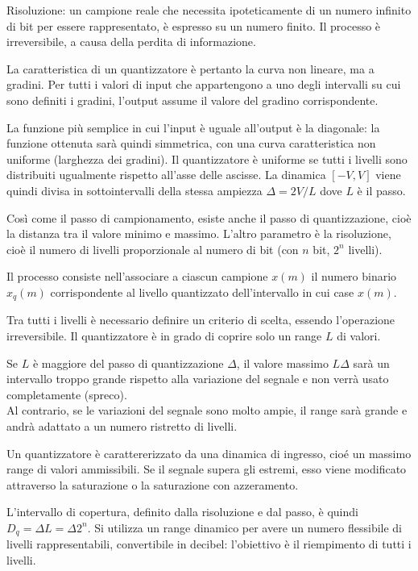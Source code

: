 Risoluzione: un campione reale che necessita ipoteticamente di un numero infinito di bit per essere rappresentato, è espresso su un numero finito. Il processo è irreversibile, a causa della perdita di informazione.

La caratteristica di un quantizzatore è pertanto la curva non lineare, ma a gradini. Per tutti i valori di input che appartengono a uno degli intervalli su cui sono definiti i gradini, l'output assume il valore del gradino corrispondente.

La funzione più semplice in cui l'input è uguale all'output è la diagonale: la funzione ottenuta sarà quindi simmetrica, con una curva caratteristica non uniforme (larghezza dei gradini). Il quantizzatore è uniforme se tutti i livelli sono distribuiti ugualmente rispetto all'asse delle ascisse. La dinamica $[-V, V]$ viene quindi divisa in sottointervalli della stessa ampiezza $\Delta = 2V / L$ dove $L$ è il passo. 

Così come il passo di campionamento, esiste anche il passo di quantizzazione, cioè la distanza tra il valore minimo e massimo. L'altro parametro è la risoluzione, cioè il numero di livelli proporzionale al numero di bit (con $n$ bit, $2^n$ livelli). 

Il processo consiste nell'associare a ciascun campione $x(m)$ il numero binario $x_q(m)$ corrispondente al livello quantizzato dell'intervallo in cui case $x(m)$.

Tra tutti i livelli è necessario definire un criterio di scelta, essendo l'operazione irreversibile. Il quantizzatore è in grado di coprire solo un range $L$ di valori.

Se $L$ è maggiore del passo di quantizzazione $\Delta$, il valore massimo $L\Delta$ sarà un intervallo troppo grande rispetto alla variazione del segnale e non verrà usato completamente (spreco). \\
Al contrario, se le variazioni del segnale sono molto ampie, il range sarà grande e andrà adattato a un numero ristretto di livelli. 

Un quantizzatore è carattererizzato da una dinamica di ingresso, cioé un massimo range di valori ammissibili. Se il segnale supera gli estremi, esso viene modificato attraverso la saturazione o la saturazione con azzeramento.

L'intervallo di copertura, definito dalla risoluzione e dal passo, è quindi $D_q = \Delta L = \Delta 2^n$. Si utilizza un range dinamico per avere un numero flessibile di livelli rappresentabili, convertibile in decibel: l'obiettivo è il riempimento di tutti i livelli.

